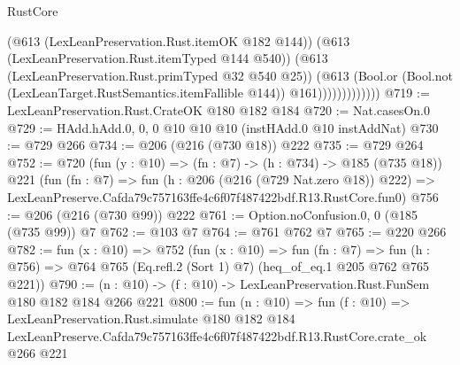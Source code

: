 \begin{lexlean}{RustCore}
\begin{coremodule}
                          (@613 (LexLeanPreservation.Rust.itemOK @182 @144))
                          (@613 (LexLeanPreservation.Rust.itemTyped @144 @540))
                          (@613 (LexLeanPreservation.Rust.primTyped @32 @540 @25))
                          (@613
                            (Bool.or
                              (Bool.not (LexLeanTarget.RustSemantics.itemFallible @144))
                              @161)))))))))))))
@719 := LexLeanPreservation.Rust.CrateOK @180 @182 @184
@720 := Nat.casesOn.{0}
@729 := HAdd.hAdd.{0, 0, 0} @10 @10 @10 (instHAdd.{0} @10 instAddNat)
@730 := @729 @266
@734 := @206 (@216 (@730 @18)) @222
@735 := @729 @264
@752 := @720
    (fun (y : @10) => (fn : @7) -> (h : @734) -> @185 (@735 @18))
    @221
    (fun (fn : @7) =>
    fun (h : @206 (@216 (@729 Nat.zero @18)) @222) =>
    LexLeanPreserve.Cafda79c757163ffe4c6f07f487422bdf.R13.RustCore.fun0)
@756 := @206 (@216 (@730 @99)) @222
@761 := Option.noConfusion.{0, 0} (@185 (@735 @99)) @7
@762 := @103 @7
@764 := @761 @762 @7
@765 := @220 @266
@782 := fun (x : @10) =>
  @752
    (fun (x : @10) =>
    fun (fn : @7) =>
    fun (h : @756) => @764 @765 (Eq.refl.{2} (Sort 1) @7) (heq_of_eq.{1} @205 @762 @765 @221))
@790 := (n : @10) -> (f : @10) -> LexLeanPreservation.Rust.FunSem @180 @182 @184 @266 @221
@800 := fun (n : @10) =>
  fun (f : @10) =>
  LexLeanPreservation.Rust.simulate
    @180
    @182
    @184
    LexLeanPreserve.Cafda79c757163ffe4c6f07f487422bdf.R13.RustCore.crate_ok
    @266
    @221
\end{coremodule}
\end{lexlean}
